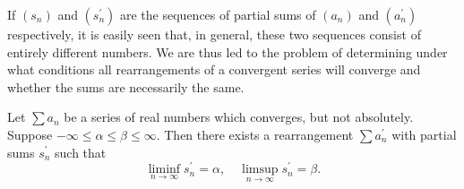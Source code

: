 If $(s_n)$ and $(s_n^\prime)$ are the sequences of partial sums of $(a_n)$ and $(a_n^\prime)$ respectively, it is easily seen that, in general, these two sequences consist of entirely different numbers. We are thus led to the problem of determining under what conditions all rearrangements of a convergent series will converge and whether the sums are necessarily the same.

\begin{theorem}
Let $\sum a_n$ be a series of real numbers which converges, but not absolutely. Suppose $-\infty\le\alpha\le\beta\le\infty$. Then there exists a rearrangement $\sum a_n^\prime$ with partial sums $s_n^\prime$ such that
\[\liminf_{n\to\infty}s_n^\prime=\alpha,\quad\limsup_{n\to\infty}s_n^\prime=\beta.\]
\end{theorem}

